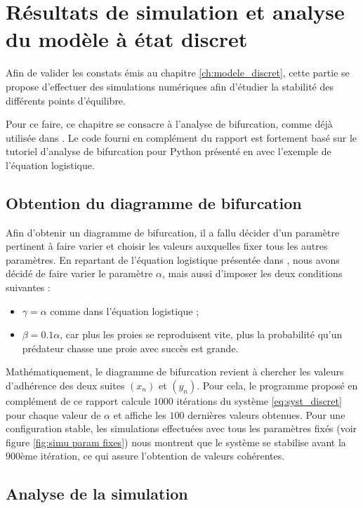 \chapter{Résultats de simulation et analyse du modèle à état discret}
\label{ch:simu}

Afin de valider les constats émis au chapitre \ref{ch:modele_discret}, cette partie se propose d'effectuer des simulations numériques afin d'étudier la stabilité des différents points d'équilibre.

Pour ce faire, ce chapitre se consacre à l'analyse de bifurcation, comme déjà utilisée dans \cite{ChaosControl}. Le code fourni en complément du rapport est fortement basé sur le tutoriel d'analyse de bifurcation pour Python présenté en \cite{bifurc} avec l'exemple de l'équation logistique.

\section{Obtention du diagramme de bifurcation}
\label{sec:diagramme_bifurcation}

Afin d'obtenir un diagramme de bifurcation, il a fallu décider d'un paramètre pertinent à faire varier et choisir les valeurs auxquelles fixer tous les autres paramètres. En repartant de l'équation logistique présentée dans \cite{bifurc}, nous avons décidé de faire varier le paramètre $\alpha$, mais aussi d'imposer les deux conditions suivantes :
\begin{itemize}
	\item $\gamma = \alpha$ comme dans l'équation logistique ;
	\item $\beta = 0.1 \alpha$, car plus les proies se reproduisent vite, plus la probabilité qu'un prédateur chasse une proie avec succès est grande.
\end{itemize}

Mathématiquement, le diagramme de bifurcation revient à chercher les valeurs d'adhérence des deux suites $(x_n)$ et $(y_n)$. Pour cela, le programme proposé en complément de ce rapport calcule $1000$ itérations du système \ref{eq:syst_discret} pour chaque valeur de $\alpha$ et affiche les $100$ dernières valeurs obtenues. Pour une configuration stable, les simulations effectuées avec tous les paramètres fixés (voir figure \ref{fig:simu param fixes}) nous montrent que le système se stabilise avant la $900$ème itération, ce qui assure l'obtention de valeurs cohérentes.

\section{Analyse de la simulation}
\label{sec:analyse_simu}

